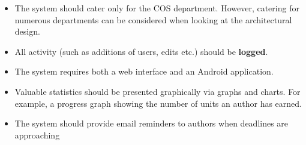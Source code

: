\documentclass[a4paper,12pt]{article}
\begin{document}
\begin{itemize}
\item The system should cater only for the COS department. However, catering for numerous departments can be considered when looking at the architectural design.

\item All activity (such as additions of users, edits etc.) should be \textbf{logged}.

\item The system requires both a web interface and an Android application.

\item Valuable statistics should be presented graphically via graphs and charts. For example, a progress graph showing the number of units an author has earned.

\item The system should provide email reminders to authors when deadlines are approaching

\end{itemize}
\end{document}
